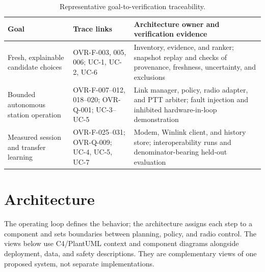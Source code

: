 \documentclass[11pt,a4paper]{article}
\begin{document}
\begin{table}[htbp]
\centering
\small
\caption{Representative goal-to-verification traceability.}
\label{tab:goal-traceability}
\begin{tabularx}{\linewidth}{@{}p{1.45in}p{2.2in}X@{}}
\toprule
\textbf{Goal} & \textbf{Trace links} & \textbf{Architecture owner and verification evidence} \\
\midrule
Fresh, explainable candidate choices & OVR-F-003, 005, 006; UC-1, UC-2, UC-6 & Inventory, evidence, and ranker; snapshot replay and checks of provenance, freshness, uncertainty, and exclusions \\
Bounded autonomous station operation & OVR-F-007--012, 018--020; OVR-Q-001; UC-3--UC-5 & Link manager, policy, radio adapter, and PTT arbiter; fault injection and inhibited hardware-in-loop demonstration \\
Measured session and transfer learning & OVR-F-025--031; OVR-Q-009; UC-4, UC-5, UC-7 & Modem, Winlink client, and history store; interoperability runs and denominator-bearing held-out evaluation \\
\bottomrule
\end{tabularx}
\end{table}

\section{Architecture}

The operating loop defines the behavior; the architecture assigns each step
to a component and sets boundaries between planning, policy, and radio control.
The views below use C4/PlantUML context and component diagrams alongside
deployment, data, and safety descriptions. They are complementary views of
one proposed system, not separate implementations.
\end{document}
